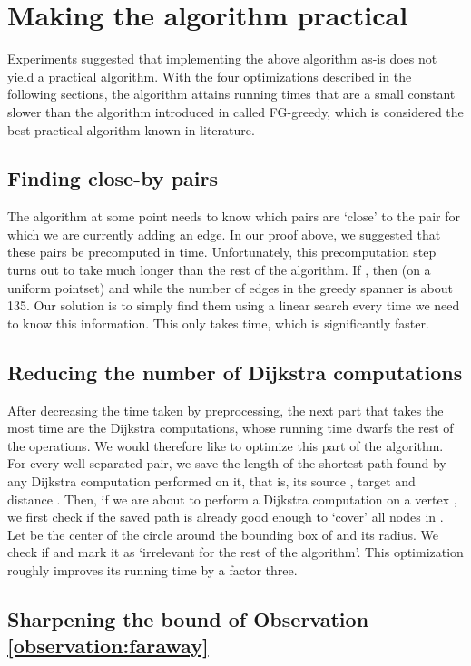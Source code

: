 \documentclass[runningheads,envcountsame,oribibl,orivec]{llncs}
\begin{document}
\section{Making the algorithm practical} \label{section:practical}

Experiments suggested that implementing the above algorithm as-is does not yield a practical algorithm. With the four optimizations described in the following sections, the algorithm attains running times that are a small constant slower than the algorithm introduced in \cite{FarshiG09} called FG-greedy, which is considered the best practical algorithm known in literature.

\subsection{Finding close-by pairs}
The algorithm at some point needs to know which pairs are `close' to the pair for which we are currently adding an edge. In our proof above, we suggested that these pairs be precomputed in  time. Unfortunately, this precomputation step turns out to take much longer than the rest of the algorithm. If , then (on a uniform pointset)  and  while the number of edges  in the greedy spanner is about 135. Our solution is to simply find them using a linear search every time we need to know this information. This only takes  time, which is significantly faster.

\subsection{Reducing the number of Dijkstra computations}

After decreasing the time taken by preprocessing, the next part that takes the most time are the Dijkstra computations, whose running time dwarfs the rest of the operations. We would therefore like to optimize this part of the algorithm. For every well-separated pair, we save the length of the shortest path found by any Dijkstra computation performed on it, that is, its source , target  and distance . Then, if we are about to perform a Dijkstra computation on a vertex , we first check if the saved path is already good enough to `cover' all nodes in . Let  be the center of the circle around the bounding box of  and  its radius. We check if  and mark it as `irrelevant for the rest of the algorithm'. This optimization roughly improves its running time by a factor three.

\subsection{Sharpening the bound of Observation \ref{observation:faraway}}
\end{document}
